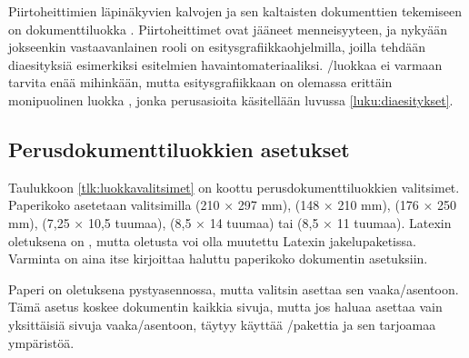 Piirtoheittimien%
 läpinäkyvien kalvojen ja sen kaltaisten
dokumenttien tekemiseen on dokumenttiluokka .
Piirtoheittimet ovat jääneet menneisyyteen, ja nykyään jokseenkin
vastaavanlainen rooli on esi\-tys\-gra\-fiikka\-ohjel\-milla, joilla
tehdään dia\-esi\-tyk\-siä esimerkiksi esitelmien havaintomateriaaliksi.
\-/luokkaa ei varmaan tarvita enää mihinkään, mutta
esi\-tys\-gra\-fiik\-kaan on olemassa erittäin monipuolinen luokka
, jonka perus\-asioita käsitellään luvussa
\ref{luku:diaesitykset}.

\subsection{Perusdokumenttiluokkien asetukset}

Taulukkoon \ref{tlk:luokkavalitsimet}%
 on koottu perusdokumenttiluokkien valitsimet.
Paperikoko asetetaan valitsimilla  (210 × 297 mm),
 (148 × 210 mm),  (176 × 250 mm),
 (7,25 × 10,5 tuumaa), 
(8,5 × 14 tuumaa) tai  (8,5 × 11 tuumaa). Latexin
oletuksena on , mutta oletusta voi olla muutettu
Latexin jakelupaketissa. Varminta on aina itse kirjoittaa haluttu
paperikoko dokumentin asetuksiin.


Paperi%
 on oletuksena pysty\-asen\-nossa, mutta valitsin
 asettaa sen vaaka\-/asentoon. Tämä asetus koskee
dokumentin kaikkia sivuja, mutta jos haluaa asettaa vain yksittäisiä
sivuja vaaka\-/asentoon, täytyy käyttää
\-/pakettia ja sen tarjoamaa
ympäristöä.

